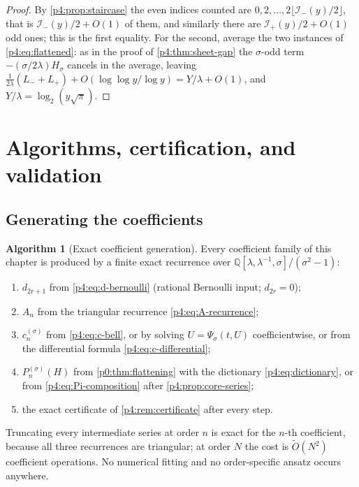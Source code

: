 \documentclass[11pt,a4paper,oneside]{book}
\theoremstyle{plain}
\theoremstyle{definition}
\newtheorem{algorithm}[theorem]{Algorithm}
\theoremstyle{remark}
\newcommand{\Rat}{\mathbb{Q}}
\begin{document}
\begin{proof}
By \cref{p4:prop:staircase} the even indices counted are
$0,2,\ldots,2\lfloor\mathcal I_-(y)/2\rfloor$, that is
$\mathcal I_-(y)/2+O(1)$ of them, and similarly there are
$\mathcal I_+(y)/2+O(1)$ odd ones; this is the first equality.  For the
second, average the two instances of \cref{p4:eq:flattened}: as in the proof
of \cref{p4:thm:sheet-gap} the $\sigma$-odd term $-(\sigma/2\lambda)H_\sigma$
cancels in the average, leaving
$\tfrac1{2\lambda}(L_-+L_+)+O(\log\log y/\log y)=Y/\lambda+O(1)$, and
$Y/\lambda=\log_2(y\sqrt\pi)$.
\end{proof}

\section{Algorithms, certification, and validation}
\label{p4:sec:algorithms}

\subsection{Generating the coefficients}

\begin{algorithm}[Exact coefficient generation]
\label{p4:alg:coefficients}
Every coefficient family of this chapter is produced by a finite exact
recurrence over $\Rat[\lambda,\lambda^{-1},\sigma]/(\sigma^{2}-1)$:
\begin{enumerate}
\item $d_{2r+1}$ from \cref{p4:eq:d-bernoulli} (rational Bernoulli input;
      $d_{2r}=0$);
\item $A_n$ from the triangular recurrence \cref{p4:eq:A-recurrence};
\item $c^{(\sigma)}_n$ from \cref{p4:eq:c-bell}, or by solving
      $U=\Psi_\sigma(t,U)$ coefficientwise, or from the differential formula
      \cref{p4:eq:c-differential};
\item $P^{(\sigma)}_n(H)$ from \cref{p0:thm:flattening} with the dictionary
      \cref{p4:eq:dictionary}, or from \cref{p4:eq:Pi-composition} after
      \cref{p4:prop:core-series};
\item the exact certificate of \cref{p4:rem:certificate} after every step.
\end{enumerate}
Truncating every intermediate series at order $n$ is exact for the $n$-th
coefficient, because all three recurrences are triangular; at order $N$ the
cost is $\widetilde{O}(N^{2})$ coefficient operations.  No numerical
fitting and no order-specific ansatz occurs anywhere.
\end{algorithm}
\end{document}
